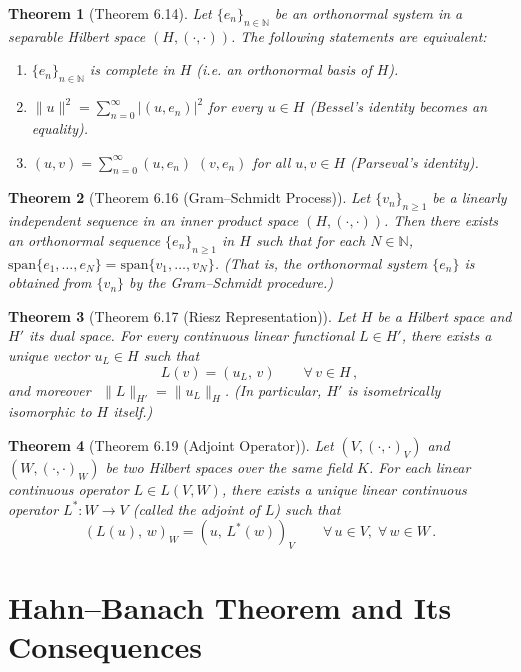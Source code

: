 \documentclass{article}
\theoremstyle{plain}
\newtheorem*{theorem*}{Theorem}
\begin{document}
\begin{theorem*}[Theorem 6.14]
Let $\{e_n\}_{n\in\mathbb{N}}$ be an orthonormal system in a separable Hilbert space $(H,(\cdot,\cdot))$. The following statements are equivalent:
\begin{enumerate}
\item $\{e_n\}_{n\in\mathbb{N}}$ is complete in $H$ (i.e. an orthonormal basis of $H$).
\item $\displaystyle \|u\|^2 = \sum_{n=0}^{\infty} |(u,e_n)|^2$ for every $u \in H$ (Bessel’s identity becomes an equality).
\item $\displaystyle (u,v) = \sum_{n=0}^{\infty} (u,e_n)\,\,(v,e_n)$ for all $u,v \in H$ (Parseval’s identity).
\end{enumerate}
\end{theorem*}

\begin{theorem*}[Theorem 6.16 (Gram–Schmidt Process)]
Let $\{v_n\}_{n\ge 1}$ be a linearly independent sequence in an inner product space $(H,(\cdot,\cdot))$. Then there exists an orthonormal sequence $\{e_n\}_{n\ge 1}$ in $H$ such that for each $N\in\mathbb{N}$, $\mathrm{span}\{e_1,\dots,e_N\} = \mathrm{span}\{v_1,\dots,v_N\}$.  (That is, the orthonormal system $\{e_n\}$ is obtained from $\{v_n\}$ by the Gram–Schmidt procedure.)
\end{theorem*}

\begin{theorem*}[Theorem 6.17 (Riesz Representation)]
Let $H$ be a Hilbert space and $H'$ its dual space. For every continuous linear functional $L \in H'$, there exists a unique vector $u_L \in H$ such that 
\[
L(v) = (u_L,\,v)\qquad \forall\,v \in H\,,
\] 
and moreover $\ $\,$\|L\|_{H'} = \|u_L\|_H$.  (In particular, $H'$ is isometrically isomorphic to $H$ itself.)
\end{theorem*}

\begin{theorem*}[Theorem 6.19 (Adjoint Operator)]
Let $(V,(\cdot,\cdot)_V)$ and $(W,(\cdot,\cdot)_W)$ be two Hilbert spaces over the same field $K$. For each linear continuous operator $L \in L(V,W)$, there exists a unique linear continuous operator $L^*: W \to V$ (called the \emph{adjoint} of $L$) such that 
\[
(L(u),\,w)_W = (u,\,L^*(w))_V \qquad \forall\,u \in V,\;\forall\,w \in W\,.
\] 
\end{theorem*}

\section{Hahn–Banach Theorem and Its Consequences}
\end{document}
